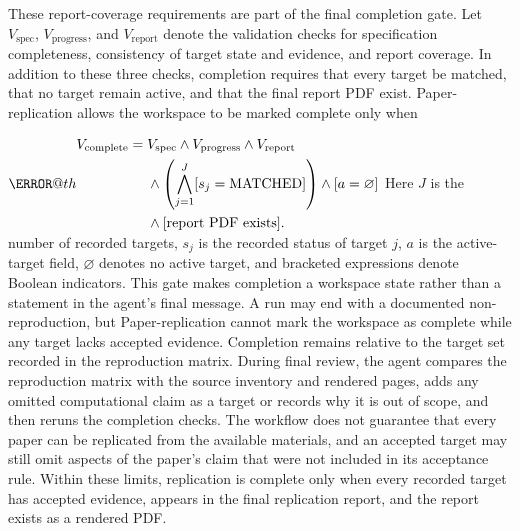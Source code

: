 \documentclass[authoryear,5p,times,nopreprintline]{elsarticle}
\makeatletter
\renewenvironment{equation}%
  {\@beginparpenalty\predisplaypenalty
   \@endparpenalty\postdisplaypenalty
   \refstepcounter{equation}%
   \trivlist\item[]\leavevmode
   \hb@xt@\linewidth\bgroup\hfil$\m@th\displaystyle}%
  {$\hfil\llap{\@eqnnum}\egroup
   \endtrivlist}
\makeatother
\begin{document}
These report-coverage requirements are part of the final completion gate.
Let \(V_{\mathrm{spec}}\), \(V_{\mathrm{progress}}\), and \(V_{\mathrm{report}}\) denote the validation checks for specification completeness, consistency of target state and evidence, and report coverage.
In addition to these three checks, completion requires that every target be matched, that no target remain active, and that the final report PDF exist.
Paper-replication allows the workspace to be marked complete only when
\begin{equation}
\begin{aligned}
V_{\mathrm{complete}} ={}& V_{\mathrm{spec}} \wedge V_{\mathrm{progress}} \wedge V_{\mathrm{report}} \\
& \wedge \left(\bigwedge_{j=1}^{J} [s_j=\mathrm{MATCHED}]\right) \wedge [a=\varnothing] \\
& \wedge [\text{report PDF exists}].
\end{aligned}
\label{eq:completion_gate}
\end{equation}
Here \(J\) is the number of recorded targets, \(s_j\) is the recorded status of target \(j\), \(a\) is the active-target field, \(\varnothing\) denotes no active target, and bracketed expressions denote Boolean indicators.
This gate makes completion a workspace state rather than a statement in the agent's final message.
A run may end with a documented non-reproduction, but Paper-replication cannot mark the workspace as complete while any target lacks accepted evidence.
Completion remains relative to the target set recorded in the reproduction matrix.
During final review, the agent compares the reproduction matrix with the source inventory and rendered pages, adds any omitted computational claim as a target or records why it is out of scope, and then reruns the completion checks.
The workflow does not guarantee that every paper can be replicated from the available materials, and an accepted target may still omit aspects of the paper's claim that were not included in its acceptance rule.
Within these limits, replication is complete only when every recorded target has accepted evidence, appears in the final replication report, and the report exists as a rendered PDF.
\end{document}

